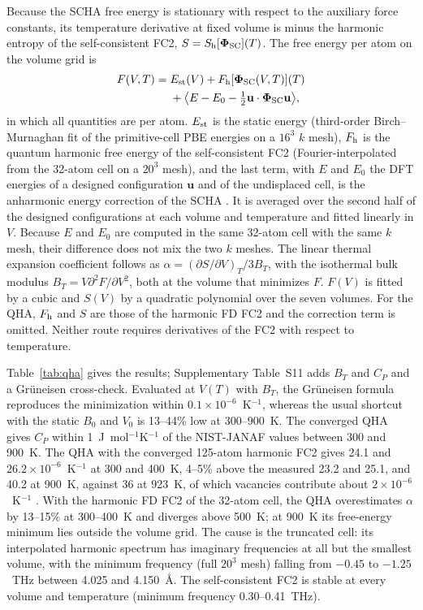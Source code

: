 \documentclass[aip,jap,reprint,amsmath,amssymb,floatfix]{revtex4-2}
\begin{document}
Because the SCHA free energy is stationary with respect to the auxiliary
force constants, its temperature derivative at fixed volume is minus the
harmonic entropy of the self-consistent FC2, $S=S_{\rm h}[\boldsymbol\Phi_{\rm
SC}](T)$. The free energy per atom on the volume grid is
\begin{align}
F(V,T)={}&E_{\rm st}(V)+F_{\rm h}[\boldsymbol\Phi_{\rm SC}(V,T)](T)\nonumber\\
&+\big\langle E-E_0-\tfrac12\mathbf u\cdot\boldsymbol\Phi_{\rm SC}\mathbf u\big\rangle ,
\label{eq:fqha}
\end{align}
in which all quantities are per atom. $E_{\rm st}$ is the static energy
(third-order Birch--Murnaghan fit of the primitive-cell PBE energies on a
$16^3$ $k$ mesh), $F_{\rm h}$ is the quantum harmonic free energy of the
self-consistent FC2 (Fourier-interpolated from the 32-atom cell on a $20^3$
mesh), and the last term, with $E$ and $E_0$ the DFT energies of a designed
configuration $\mathbf u$ and of the undisplaced cell, is the anharmonic
energy correction of the SCHA \cite{ref7,ref50}. It is averaged over the
second half of the designed configurations at each volume and temperature
and fitted linearly in $V$. Because $E$ and $E_0$ are computed in the same
32-atom cell with the same $k$ mesh, their difference does not mix the two
$k$ meshes. The linear thermal expansion coefficient follows as
$\alpha=(\partial S/\partial V)_T/3B_T$, with the isothermal bulk modulus
$B_T=V\partial^2F/\partial V^2$, both at the volume that minimizes $F$.
$F(V)$ is fitted by a cubic and $S(V)$ by a quadratic polynomial over the
seven volumes. For the QHA, $F_{\rm h}$ and $S$ are those of the harmonic FD
FC2 and the correction term is omitted. Neither route requires derivatives
of the FC2 with respect to temperature.

Table~\ref{tab:qha} gives the results; Supplementary Table~S11 adds $B_T$
and $C_P$ and a Gr\"uneisen cross-check. Evaluated at $V(T)$ with $B_T$, the
Gr\"uneisen formula reproduces the minimization within
$0.1\times10^{-6}$~K$^{-1}$, whereas the usual shortcut with the static $B_0$
and $V_0$ is 13--44\% low at 300--900~K. The converged QHA gives $C_P$
within 1~J~mol$^{-1}$K$^{-1}$ of the NIST-JANAF values \cite{chase1998}
between 300 and 900~K. The QHA with the converged 125-atom
harmonic FC2 gives 24.1 and $26.2\times10^{-6}$~K$^{-1}$ at 300 and 400~K,
4--5\% above the measured 23.2 and 25.1, and 40.2 at 900~K, against 36 at
923~K, of which vacancies contribute about $2\times10^{-6}$~K$^{-1}$
\cite{nakashima2020}.
With the harmonic FD FC2 of the 32-atom cell, the QHA overestimates $\alpha$
by 13--15\% at 300--400~K and diverges above 500~K; at 900~K its free-energy
minimum lies outside the volume grid. The cause is the truncated cell: its
interpolated harmonic spectrum has imaginary frequencies at all but the
smallest volume, with the minimum frequency (full $20^3$ mesh) falling from
$-0.45$ to $-1.25$~THz between 4.025 and 4.150~\AA. The self-consistent
FC2 is stable at every volume and temperature (minimum frequency
0.30--0.41~THz).
\end{document}
